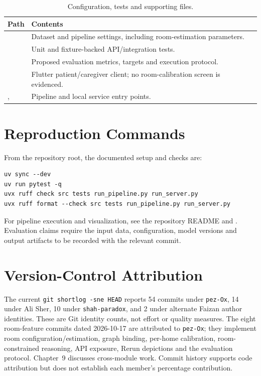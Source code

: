 \begin{table}[H]\centering\small
\caption{Configuration, tests and supporting files.}\label{tab:appendix-support-paths}
\begin{tabularx}{\textwidth}{@{}L{4.8cm}Y@{}}\toprule
\textbf{Path}&\textbf{Contents}\\\midrule
{}&Dataset and pipeline settings, including room-estimation parameters.\\
&Unit and fixture-backed API/integration tests.\\
&Proposed evaluation metrics, targets and execution protocol.\\
&Flutter patient/caregiver client; no room-calibration screen is evidenced.\\
, &Pipeline and local service entry points.\\
\bottomrule\end{tabularx}\end{table}

\section{Reproduction Commands}
From the repository root, the documented setup and checks are:
\begin{verbatim}
uv sync --dev
uv run pytest -q
uvx ruff check src tests run_pipeline.py run_server.py
uvx ruff format --check src tests run_pipeline.py run_server.py
\end{verbatim}
For pipeline execution and visualization, see the repository README and
. Evaluation claims require the input data,
configuration, model versions and output artifacts to be recorded with the
relevant commit.

\section{Version-Control Attribution}
The current \texttt{git shortlog -sne HEAD} reports 54 commits under
\texttt{pez-Ox}, 14 under Ali Sher, 10 under \texttt{shah-paradox}, and 2 under
alternate Faizan author identities. These are Git identity counts, not effort
or quality measures. The eight room-feature commits dated 2026-10-17 are
attributed to \texttt{pez-Ox}; they implement room configuration/estimation,
graph binding, per-home calibration, room-constrained reasoning, API exposure,
Rerun depictions and the evaluation protocol. Chapter~9 discusses cross-module
work. Commit history supports code attribution but does not establish each
member's percentage contribution.